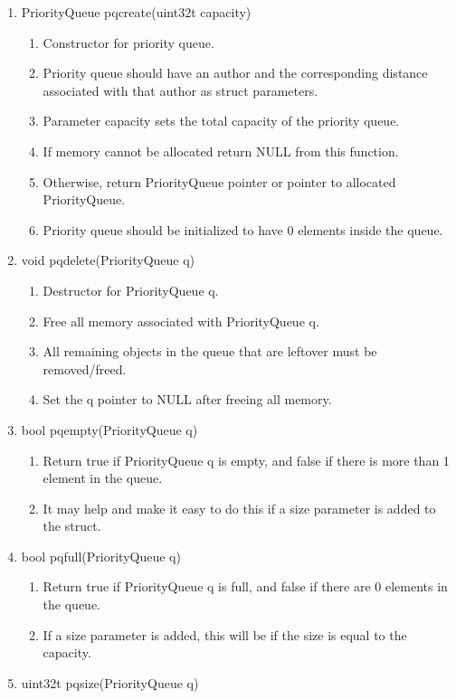 \documentclass[11pt]{article}
\begin{document}
\begin{enumerate}
\item PriorityQueue pqcreate(uint32t capacity)
	\begin{enumerate}
	\item Constructor for priority queue.
	\item Priority queue should have an author and the corresponding distance associated with that author as struct parameters.
	\item Parameter capacity sets the total capacity of the priority queue.
	\item If memory cannot be allocated return NULL from this function.
	\item Otherwise, return PriorityQueue pointer or pointer to allocated PriorityQueue.
	\item Priority queue should be initialized to have 0 elements inside the queue.
	\end{enumerate}
\item void pqdelete(PriorityQueue q)
	\begin{enumerate}
	\item Destructor for PriorityQueue q.
	\item Free all memory associated with PriorityQueue q.
	\item All remaining objects in the queue that are leftover must be removed/freed.
	\item Set the q pointer to NULL after freeing all memory.
	\end{enumerate}
\item bool pqempty(PriorityQueue q)
	\begin{enumerate}
	\item Return true if PriorityQueue q is empty, and false if there is more than 1 element in the queue.
	\item It may help and make it easy to do this if a size parameter is added to the struct.
	\end{enumerate}
\item bool pqfull(PriorityQueue q)
	\begin{enumerate}
	\item Return true if PriorityQueue q is full, and false if there are 0 elements in the queue.
	\item If a size parameter is added, this will be if the size is equal to the capacity.
	\end{enumerate}
\item uint32t pqsize(PriorityQueue q)
	\begin{enumerate}

\end{enumerate}
\end{enumerate}
\end{document}

